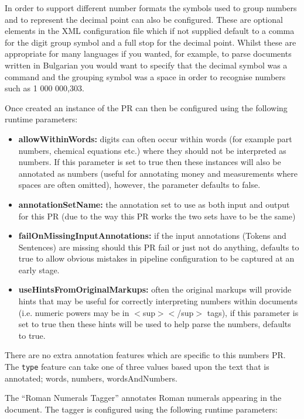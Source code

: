 In order to support different number formats the symbols used to group numbers
and to represent the decimal point can also be configured. These are optional
elements in the XML configuration file which if not supplied default to a comma
for the digit group symbol and a full stop for the decimal point. Whilst these
are appropriate for many languages if you wanted, for example, to parse
documents written in Bulgarian you would want to specify that the decimal symbol
was a command and the grouping symbol was a space in order to recognise numbers
such as 1 000 000,303.

Once created an instance of the PR can then be configured using the following
runtime parameters:

\begin{itemize}
\item \textbf{allowWithinWords:} digits can often occur within words (for
  example part numbers, chemical equations etc.) where they should not be
  interpreted as numbers. If this parameter is set to true then these instances
  will also be annotated as numbers (useful for annotating money and
  measurements where spaces are often omitted), however, the parameter defaults
  to false.
\item \textbf{annotationSetName:} the annotation set to use as both input and
  output for this PR (due to the way this PR works the two sets have to be the
  same)
\item \textbf{failOnMissingInputAnnotations:} if the input annotations (Tokens
  and Sentences) are missing should this PR fail or just not do anything,
  defaults to true to allow  obvious mistakes in pipeline configuration to be
  captured at an early stage.
\item \textbf{useHintsFromOriginalMarkups:} often the original markups will
  provide hints that may be useful for correctly interpreting numbers within
  documents  (i.e. numeric powers may be in $<$sup$><$/sup$>$ tags), if this
  parameter is set to true then these hints will be used to help parse the
  numbers, defaults to true.
\end{itemize}

There are no extra annotation features which are specific to this numbers PR.
The \texttt{type} feature can take one of three values based upon the text that
is annotated; words, numbers, wordsAndNumbers.


The ``Roman Numerals Tagger'' annotates Roman numerals appearing in the document. The tagger is configured using the following runtime parameters:

